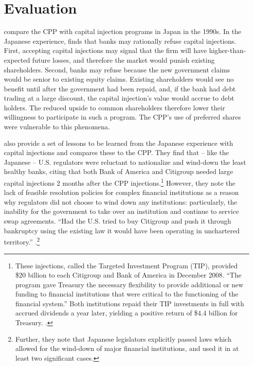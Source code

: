 \documentclass[12pt]{article}
\begin{document}
\section{Evaluation}

\citet{Hoshi} compare the CPP with capital injection programs in Japan in the 1990s. In the Japanese experience, \citet{Hoshi} finds that banks may rationally refuse capital injections. First, accepting capital injections may signal that the firm will have higher-than-expected future losses, and therefore the market would punish existing shareholders. Second, banks may refuse because the new government claims would be senior to existing equity claims. Existing shareholders would see no benefit until after the government had been repaid, and, if the bank had debt trading at a large discount, the capital injection's value would accrue to debt holders. The reduced upside to common shareholders therefore lower their willingness to participate in such a program. The CPP's use of preferred shares were vulnerable to this phenomena.

\citet{Hoshi} also provide a set of lessons to be learned from the Japanese experience with capital injections and compares these to the CPP. They find that -- like the Japanese -- U.S. regulators were reluctant to nationalize and wind-down the least healthy banks, citing that both Bank of America and Citigroup needed large capital injections 2 months after the CPP injections.\footnote{These injections, called the Targeted Investment Program (TIP), provided \$20 billion to each Citigroup and Bank of America in December 2008. ``The program gave Treasury the necessary flexibility to provide additional or new funding to financial institutions that were critical to the functioning of the financial system.'' Both institutions repaid their TIP investments in full with accrued dividends a year later, yielding a positive return of \$4.4 billion for Treasury. \citep{TIP}.} However, they note the lack of feasible resolution policies for complex financial institutions as a reason why regulators did not choose to wind down any institutions: particularly, the inability for the government to take over an institution and continue to service swap agreements. ``Had the U.S. tried to buy Citigroup and push it through bankruptcy using the existing law it would have been operating in unchartered territory.'' \citep{Hoshi}.\footnote{Further, they note that Japanese legislators explicitly passed laws which allowed for the wind-down of major financial institutions, and used it in at least two significant cases.}
\end{document}
